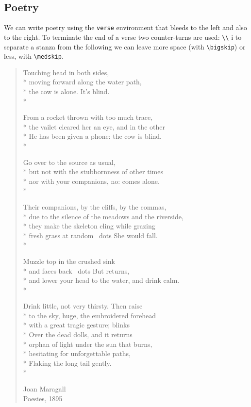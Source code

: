 \documentclass[a4paper,
                             twoside,
                             BCOR1.0cm,
                             DIV11,
                             parskip=full,
                             11pt]{scrbook}
\begin{document}
\subsection{Poetry}\label{sbsec:poetry}

We can write poetry using the \verb+verse+ environment that bleeds to the left and also to the right. To terminate the end of a verse two counter-turns are used: \verb+\\+ i to separate a stanza from the following we can leave more space (with \verb+\bigskip+) or less, with \verb+\medskip+.

\begin{verse}
Touching head in both sides, \\*
moving forward along the water path, \\*
the cow is alone. It's blind. \\*
\medskip

From a rocket thrown with too much trace, \\*
the vailet cleared her an eye, and in the other \\*
He has been given a phone: the cow is blind. \\*
\medskip

Go over to the source as usual, \\*
but not with the stubbornness of other times \\*
nor with your companions, no: comes alone. \\*
\medskip

Their companions, by the cliffs, by the commas, \\*
due to the silence of the meadows and the riverside, \\*
they make the skeleton cling while grazing \\*
fresh grass at random \ dots She would fall. \\*
\medskip

Muzzle top in the crushed sink \\*
and faces back \ dots But returns, \\*
and lower your head to the water, and drink calm. \\*
\medskip

Drink little, not very thirsty. Then raise \\*
to the sky, huge, the embroidered forehead \\*
with a great tragic gesture; blinks \\*
Over the dead dolls, and it returns \\*
orphan of light under the sun that burns, \\*
hesitating for unforgettable paths, \\*
Flaking the long tail gently. \\*
\medskip
\begin{flushright}
Joan Maragall\\
Poesies, 1895\\
\end{flushright}
\end{verse}
\end{document}
